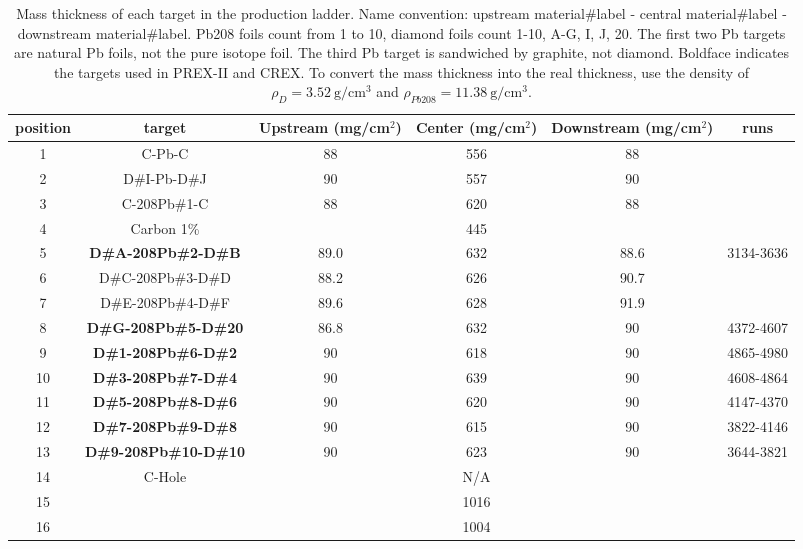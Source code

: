 \begin{table}[!h]
    \centering
    \begin{tabular}{c | c | c c c c}
	\hline
	position    & target& \makecell{Upstream \\ (mg/cm${}^2$)}    & \makecell{Center \\ (mg/cm${}^2$)}     & \makecell{Downstream \\ (mg/cm${}^2$)}   & runs  \\
	\hline
	1   & C-Pb-C	    & 88    & 556   & 88    & \\
	2   & D\#I-Pb-D\#J      & 90    & 557   & 90    & \\
	\hline
	3   & C-208Pb\#1-C    & 88    & 620   & 88    & \\
	4   & Carbon 1\%    &       & 445   &	    & \\
	\hline
	5   & \textbf{D\#A-208Pb\#2-D\#B}  & 89.0  & 632   & 88.6  & 3134-3636 \\
	6   & D\#C-208Pb\#3-D\#D  & 88.2  & 626   & 90.7  & \\
	7   & D\#E-208Pb\#4-D\#F  & 89.6  & 628   & 91.9  & \\
	8   & \textbf{D\#G-208Pb\#5-D\#20} & 86.8  & 632   & 90    & 4372-4607 \\
	9   & \textbf{D\#1-208Pb\#6-D\#2}  & 90    & 618   & 90    & 4865-4980 \\
	10  & \textbf{D\#3-208Pb\#7-D\#4}  & 90    & 639   & 90    & 4608-4864 \\
	11  & \textbf{D\#5-208Pb\#8-D\#6}  & 90    & 620   & 90    & 4147-4370 \\
	12  & \textbf{D\#7-208Pb\#9-D\#8}  & 90    & 615   & 90    & 3822-4146 \\
	13  & \textbf{D\#9-208Pb\#10-D\#10}& 90    & 623   & 90    & 3644-3821 \\
	\hline
	14  & C-Hole	    &       & N/A   &       & \\
	15  & \textbf{\Ca}	    &       & 1016  &       & \\
	16  & \ca	    &       & 1004  &       & \\
	\hline
    \end{tabular}
    \caption[Target mass thickness]
    {Mass thickness of each target in the production ladder. 
    Name convention: upstream material\#label - central material\#label - downstream material\#label. 
    Pb208 foils count from 1 to 10, diamond foils count 1-10, A-G, I, J, 20. 
    The first two Pb targets are natural Pb foils, not the pure \Pb isotope foil. 
    The third Pb target is sandwiched by graphite, not diamond. Boldface indicates
    the targets used in PREX-II and CREX. To convert the mass thickness into 
    the real thickness, use the density of $\rho_D = 3.52\ \mathrm{g}/\mathrm{cm}^3$ 
    and $\rho_{Pb208} = 11.38 \ \mathrm{g}/\mathrm{cm}^3$.}
    \label{tab:target_thickness}
\end{table}

